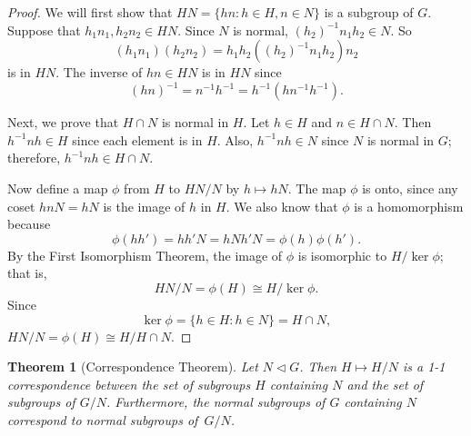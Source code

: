 \documentclass[12pt]{article}
\newtheorem{thm}{Theorem}[section]
\theoremstyle{plain}
\begin{document}
\begin{proof}
We will first show that $HN = \{ hn : h \in H, n \in N \}$ is a
subgroup of $G$.  Suppose that  $h_1 n_1, h_2 n_2 \in HN$. Since
$N$ is normal, $(h_2)^{-1} n_1 h_2 \in N$. So
\[
(h_1 n_1)(h_2 n_2) = h_1 h_2 ( (h_2)^{-1} n_1 h_2 )n_2
\]
is in $HN$. The inverse of $hn \in HN$ is in $HN$ since
\[
( hn )^{-1} = n^{-1 } h^{-1} = h^{-1} (h n^{-1} h^{-1} ).
\]


Next, we prove that $H \cap N$ is normal in $H$. Let $h \in H$ and $n
\in H \cap N$. Then $h^{-1} n h \in H$ since each element is in $H$.
Also, $h^{-1} n h \in N$ since $N$ is normal in $G$; therefore,
$h^{-1} n h \in H \cap N$.


Now define a map $\phi$ from $H$ to $ HN / N$ by $h \mapsto h N$. The
map $\phi$ is onto, since any coset $h n N = h N$ is the image of $h$
in $H$. We also know that $\phi$ is a homomorphism because
\[
\phi( h  h')  = h h' N =  h N h' N =  \phi( h ) \phi( h').
\]
By the First Isomorphism Theorem, the image of $\phi$ is isomorphic to
$H / \ker \phi$; that is,
\[
HN/N = \phi(H) \cong H / \ker \phi.
\]
Since
\[
\ker \phi = \{ h \in H : h \in N \} = H \cap N,
\]
$HN/N = \phi(H) \cong H / H \cap N$.
\end{proof}


\begin{thm}[Correspondence Theorem]\label{CorrespondTheorem}
Let $N \vartriangleleft G$. Then $H \mapsto H/N$ is a 1-1 correspondence between the set of subgroups $H$
containing $N$  and the set of subgroups of $G/N$. Furthermore, the normal subgroups of $G$ containing $N$ correspond to normal subgroups of~$G/N$.
\end{thm}
\end{document}
